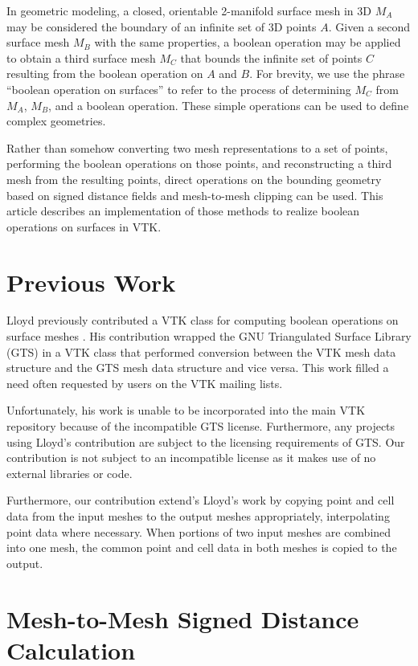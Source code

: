 \documentclass{InsightArticle}
\begin{document}
In geometric modeling, a closed, orientable 2-manifold surface mesh in 3D $M_A$ may be considered the boundary of an infinite set of 3D points $A$. Given a second surface mesh $M_B$ with the same properties, a boolean operation may be applied to obtain a third surface mesh $M_C$ that bounds the infinite set of points $C$ resulting from the boolean operation on $A$ and $B$. For brevity, we use the phrase ``boolean operation on surfaces'' to refer to the process of determining $M_C$ from $M_A$, $M_B$, and a boolean operation. These simple operations can be used to define complex geometries.

Rather than somehow converting two mesh representations to a set of points, performing the boolean operations on those points, and reconstructing a third mesh from the resulting points, direct operations on the bounding geometry based on signed distance fields and mesh-to-mesh clipping can be used. This article describes an implementation of those methods to realize boolean operations on surfaces in VTK.

\section{Previous Work}

Lloyd previously contributed a VTK class for computing boolean operations on surface meshes \cite{Lloyd2010}. His contribution wrapped the GNU Triangulated Surface Library (GTS) in a VTK class that performed conversion between the VTK mesh data structure and the GTS mesh data structure and vice versa. This work filled a need often requested by users on the VTK mailing lists.

Unfortunately, his work is unable to be incorporated into the main VTK repository because of the  incompatible GTS license. Furthermore, any projects using Lloyd's contribution are subject to the licensing requirements of GTS. Our contribution is not subject to an incompatible license as it makes use of no external libraries or code.

Furthermore, our contribution extend's Lloyd's work by copying point and cell data from the input meshes to the output meshes appropriately, interpolating point data where necessary. When portions of two input meshes are combined into one mesh, the common point and cell data in both meshes is copied to the output.

\section{Mesh-to-Mesh Signed Distance Calculation}
\end{document}
